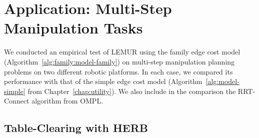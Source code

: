 \section{Application: Multi-Step Manipulation Tasks}
\label{subsec:family:app-multi-step}

We conducted an empirical test of LEMUR using the
family edge cost model (Algorithm~\ref{alg:family:model-family})
on multi-step manipulation planning problems on two different robotic
platforms.
In each case,
we compared its performance with that of the simple edge cost model
(Algorithm~\ref{alg:model-simple} from Chapter~\ref{chap:utility}).
We also include in the comparison the RRT-Connect algorithm
from OMPL.

\subsection{Table-Clearing with HERB}

